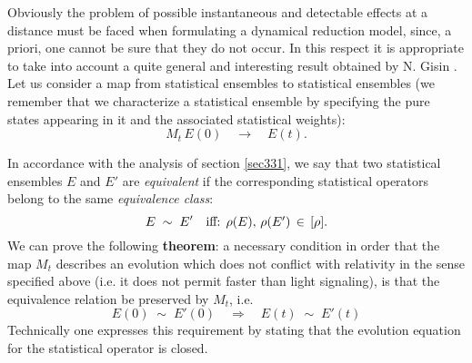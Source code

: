 \documentclass[10pt,a4paper]{article}
\begin{document}
Obviously the problem of possible instantaneous and detectable
effects at a distance must be faced when formulating a dynamical
reduction model, since, a priori, one cannot be sure that they do
not occur. In this respect it is appropriate to take into account
a quite general and interesting result obtained by N. Gisin
\cite{gisfl}. Let us consider a map from statistical ensembles to
statistical ensembles (we remember that we characterize a
statistical ensemble by specifying the pure states appearing in it
and the associated statistical weights):
\begin{equation}
M_{t}\, E(0) \quad \longrightarrow \quad E(t).
\end{equation}

In accordance with the analysis of section \ref{sec331}, we say
that two statistical ensembles $E$ and $E'$ are {\it equivalent}
if the corresponding statistical operators belong to the same {\it
equivalence class}:
\begin{equation}
E \; \sim \; E' \quad \makebox{iff: $\rho(E),\, \rho(E')\, \in \,
[\rho]$}.
\end{equation}
We can prove the following {\bf theorem}: a necessary condition in
order that the map $M_{t}$ describes an evolution which does not
conflict with relativity in the sense specified above (i.e. it
does not permit  faster than light signaling), is that the
equivalence relation be preserved by $M_{t}$, i.e.
\begin{equation}
E(0) \; \sim \; E'(0) \quad \Longrightarrow \quad E(t) \; \sim \;
E'(t)
\end{equation}
Technically one expresses this requirement by stating that the
evolution equation for the statistical operator is closed.
\end{document}
